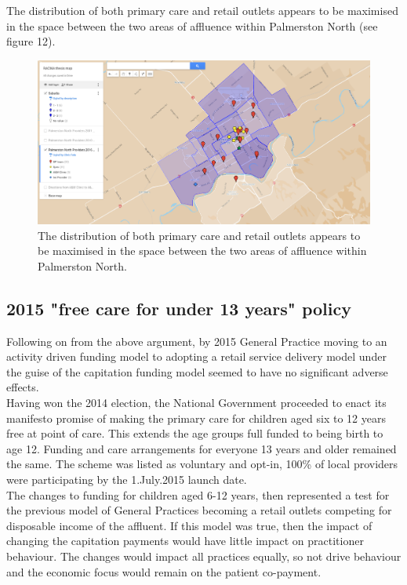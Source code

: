 \documentclass[11pt,a4paper]{article}
\begin{document}
The distribution of both primary care and retail outlets appears to be maximised in the space between the two areas of affluence within Palmerston North (see figure 12).\\

\begin{figure}[htp]
\centering
\includegraphics[scale=0.40]{fig12.png}
\caption{The distribution of both primary care and retail outlets appears to be maximised in the space between the two areas of affluence within Palmerston North.}
\label{Distribution of General Practitioners overlaid on suburb's social deprivation}
\end{figure}

\pagebreak
\subsection{2015 "free care for under 13 years" policy}
Following on from the above argument, by 2015 General Practice moving to an activity driven funding model to adopting a retail service delivery model under the guise of the capitation funding model seemed to have no significant adverse effects.\\

Having won the 2014 election, the National Government proceeded to enact its manifesto promise of making the primary care for children aged six to 12 years free at point of care. This extends the age groups full funded to being birth to age 12. Funding and care arrangements for everyone 13 years and older remained the same. The scheme was listed as voluntary and opt-in, 100\% of local providers were participating by the 1.July.2015 launch date.\\

The changes to funding for children aged 6-12 years, then represented a test for the previous model of General Practices becoming a retail outlets competing for disposable income of the affluent. If this model was true, then the impact of changing the capitation payments would have little impact on practitioner behaviour. The changes would impact all practices equally, so not drive behaviour and the economic focus would remain on the patient co-payment.\\
\end{document}
